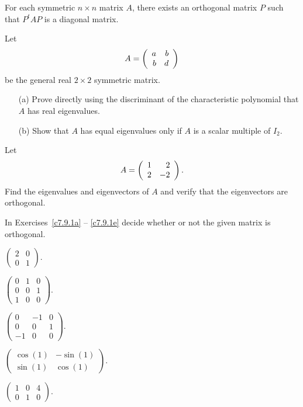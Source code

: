 \documentclass{ximera}
\begin{document}

\begin{proposition}  For each symmetric $n\times n$ matrix $A$, there exists an
orthogonal matrix $P$ such that $P^tAP$ is a diagonal matrix.
\end{proposition}



\EXER

\TEXER

\begin{exercise} \label{c7.7.1}
Let
\[
A = \left(\begin{array}{rr} a & b\\ b &d\end{array}\right)
\]
be the general real $2\times 2$ symmetric matrix.
\begin{itemize}
\item[(a)]  Prove directly using the discriminant of the characteristic
polynomial that $A$ has real eigenvalues.
\item[(b)]  Show that $A$ has equal eigenvalues only if $A$ is a scalar
multiple of $I_2$.
\end{itemize}
\end{exercise}

\begin{exercise} \label{c7.7.2}
Let
\[
A=\left(\begin{array}{rr} 1 & 2\\ 2 &-2\end{array}\right).
\]
Find the eigenvalues and eigenvectors of $A$ and verify that the eigenvectors
are orthogonal.
\end{exercise}

\noindent In Exercises~\ref{c7.9.1a} -- \ref{c7.9.1e} decide whether or not
the given matrix is orthogonal.
\begin{exercise} \label{c7.9.1a}
$\left(\begin{array}{rr} 2 & 0\\ 0 & 1\end{array}\right)$.
\end{exercise}
\begin{exercise} \label{c7.9.1b}
$\left(\begin{array}{rrr} 0 & 1 & 0\\ 0 & 0 & 1\\
1 & 0 & 0\end{array}\right)$.
\end{exercise}
\begin{exercise} \label{c7.9.1c}
$\left(\begin{array}{rrr} 0 & -1 & 0\\ 0 & 0 & 1\\
-1 & 0 & 0\end{array}\right)$.
\end{exercise}
\begin{exercise} \label{c7.9.1d}
$\left(\begin{array}{rr} \cos(1) & -\sin(1)\\ \sin(1) & \cos(1)
\end{array}\right)$.
\end{exercise}
\begin{exercise} \label{c7.9.1e}
$\left(\begin{array}{rrr} 1 & 0 & 4\\ 0 & 1 & 0
\end{array}\right)$.
\end{exercise}
\end{document}
